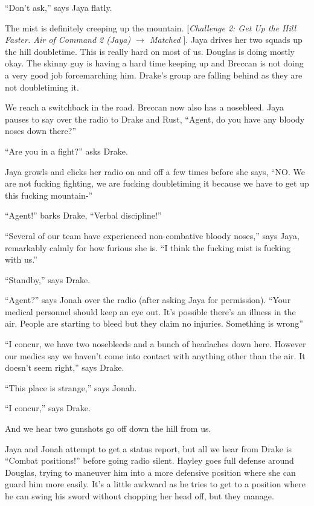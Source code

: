 ``Don't ask,'' says Jaya flatly.

The mist is definitely creeping up the mountain.  {[}\textit{Challenge 2: Get Up the Hill Faster.  Air of Command 2 (Jaya) $\rightarrow$ Matched }{]}. Jaya drives her two squads up the hill doubletime.  This is really hard on most of us.  Douglas is doing mostly okay.  The skinny guy is having a hard time keeping up and Breccan is not doing a very good job forcemarching him.  Drake's group are falling behind as they are not doubletiming it.



We reach a switchback in the road.  Breccan now also has a nosebleed.  Jaya pauses to say over the radio to Drake and Rust, ``Agent, do you have any bloody noses down there?''

``Are you in a fight?'' asks Drake.

Jaya growls and clicks her radio on and off a few times before she says, ``NO.  We are not fucking fighting, we are fucking doubletiming it because we have to get up this fucking mountain-''

``Agent!'' barks Drake, ``Verbal discipline!''

``Several of our team have experienced non-combative bloody noses,'' says Jaya, remarkably calmly for how furious she is.  ``I think the fucking mist is fucking with us.''

``Standby,'' says Drake.

``Agent?'' says Jonah over the radio (after asking Jaya for permission).  ``Your medical personnel should keep an eye out.  It's possible there's an illness in the air.  People are starting to bleed but they claim no injuries.  Something is wrong''

``I concur, we have two nosebleeds and a bunch of headaches down here.  However our medics say we haven't come into contact with anything other than the air.  It doesn't seem right,'' says Drake.

``This place is strange,'' says Jonah.

``I concur,'' says Drake. 

And we hear two gunshots go off down the hill from us.



Jaya and Jonah attempt to get a status report, but all we hear from Drake is ``Combat positions!'' before going radio silent.  Hayley goes full defense around Douglas, trying to maneuver him into a more defensive position where she can guard him more easily.  It's a little awkward as he tries to get to a position where he can swing his sword without chopping her head off, but they manage.

